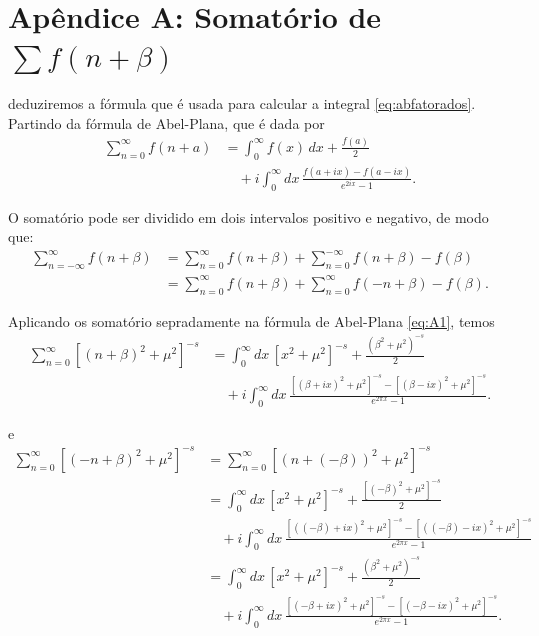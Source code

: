
\chapter*{Apêndice A: Somatório de $\sum f(n+\beta)$}

deduziremos a fórmula que é usada para calcular a integral \eqref{eq:abfatorados}.
Partindo da fórmula de Abel-Plana, que é dada por
\begin{equation}
\begin{aligned}
\sum_{n=0}^{\infty} f(n+a)
&=
\int_{0}^{\infty} f(x)\,dx
+
\frac{f(a)}{2}
\\[4pt]
&\quad
+
i \int_{0}^{\infty} dx \,
\frac{f(a+ix)-f(a-ix)}{e^{2ix}-1}.
\end{aligned}
\tag{A1}
\label{eq:A1}
\end{equation}

O somatório pode ser dividido em dois intervalos positivo e negativo, de modo que:
\begin{equation}
\begin{aligned}
\sum_{n=-\infty}^{\infty} f(n+\beta)
&=
\sum_{n=0}^{\infty} f(n+\beta)
+
\sum_{n=0}^{-\infty} f(n+\beta)
-
f(\beta)
\\[4pt]
&=
\sum_{n=0}^{\infty} f(n+\beta)
+
\sum_{n=0}^{\infty} f(-n+\beta)
-
f(\beta).
\end{aligned}
\tag{A2}
\label{eq:A2}
\end{equation}

Aplicando os somatório sepradamente na fórmula de Abel-Plana \eqref{eq:A1}, temos
\begin{equation}
\begin{aligned}
\sum_{n=0}^{\infty} \left[(n+\beta)^2+\mu^2\right]^{-s}
&=
\int_{0}^{\infty} dx \,\left[x^2+\mu^2\right]^{-s}
+
\frac{(\beta^2+\mu^2)^{-s}}{2}
\\[4pt]
&\quad
+
i\int_{0}^{\infty} dx \,
\frac{
\left[(\beta+ix)^2+\mu^2\right]^{-s}
-
\left[(\beta-ix)^2+\mu^2\right]^{-s}
}{
e^{2\pi x}-1
}.
\end{aligned}
\tag{A3}
\label{eq:A3}
\end{equation}

e
\begin{equation}
\begin{aligned}
\sum_{n=0}^{\infty} \left[(-n+\beta)^2+\mu^2\right]^{-s}
&=
\sum_{n=0}^{\infty} \left[(n+(-\beta))^2+\mu^2\right]^{-s}
\\[4pt]
&=
\int_{0}^{\infty} dx \,\left[x^2+\mu^2\right]^{-s}
+
\frac{\left[(-\beta)^2+\mu^2\right]^{-s}}{2}
\\[4pt]
&\quad
+
i\int_{0}^{\infty} dx \,
\frac{
\left[((-\beta)+ix)^2+\mu^2\right]^{-s}
-
\left[((-\beta)-ix)^2+\mu^2\right]^{-s}
}{
e^{2\pi x}-1
}
\\[4pt]
&=
\int_{0}^{\infty} dx \,\left[x^2+\mu^2\right]^{-s}
+
\frac{(\beta^2+\mu^2)^{-s}}{2}
\\[4pt]
&\quad
+
i\int_{0}^{\infty} dx \,
\frac{
\left[(-\beta+ix)^2+\mu^2\right]^{-s}
-
\left[(-\beta-ix)^2+\mu^2\right]^{-s}
}{
e^{2\pi x}-1
}.
\end{aligned}
\tag{A4}
\label{eq:A4}
\end{equation}

